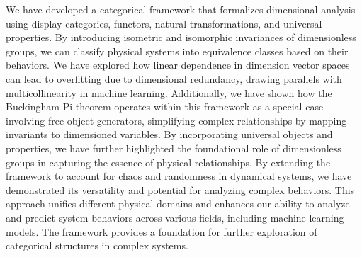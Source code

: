 \documentclass{article}
\theoremstyle{definition}
\theoremstyle{remark}
\begin{document}
	We have developed a categorical framework that formalizes dimensional analysis using display categories, functors, natural transformations, and universal properties. By introducing isometric and isomorphic invariances of dimensionless groups, we can classify physical systems into equivalence classes based on their behaviors. We have explored how linear dependence in dimension vector spaces can lead to overfitting due to dimensional redundancy, drawing parallels with multicollinearity in machine learning. Additionally, we have shown how the Buckingham Pi theorem operates within this framework as a special case involving free object generators, simplifying complex relationships by mapping invariants to dimensioned variables. By incorporating universal objects and properties, we have further highlighted the foundational role of dimensionless groups in capturing the essence of physical relationships. By extending the framework to account for chaos and randomness in dynamical systems, we have demonstrated its versatility and potential for analyzing complex behaviors. This approach unifies different physical domains and enhances our ability to analyze and predict system behaviors across various fields, including machine learning models. The framework provides a foundation for further exploration of categorical structures in complex systems.
	
\end{document}
